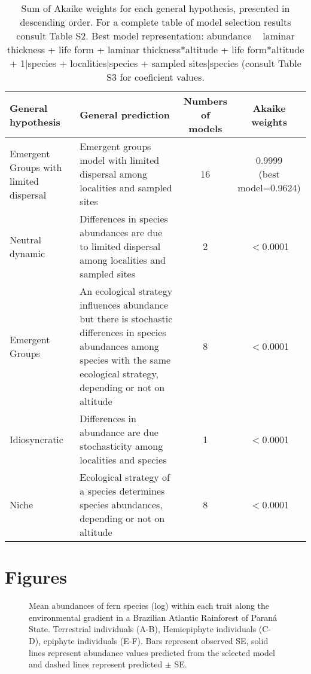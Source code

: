 \documentclass[12pt]{article}
\begin{document}
  \begin{table}[!ht]
  \caption{ Sum of Akaike weights for each general hypothesis, presented in descending order. For a complete table of model selection results consult Table S2. Best model representation: abundance ~ laminar thickness + life form + laminar thickness*altitude + life form*altitude + 1|species + localities|species + sampled sites|species (consult Table S3 for coeficient values.}\label{pesos}
  \begin{tabular}{p{4cm}p{6cm}cc}
   
\hline \bf General hypothesis	& \bf General prediction & \makecell{\bf Numbers \\ \bf of models} & \bf \makecell{Akaike \\ weights}	\\ \hline
Emergent Groups with limited dispersal & Emergent groups model with limited dispersal among localities and sampled sites  & 16 &  \makecell{0.9999 \\ (best model=0.9624)}\\  

Neutral dynamic	&	Differences in species abundances are due to limited dispersal 
among localities and sampled sites &	2 & {$<$}0.0001		\\ 

Emergent Groups	&	An ecological strategy influences abundance but there is 
stochastic differences in species abundances among species with the same 
ecological strategy, depending or not on altitude	& 8 &  {$<$}0.0001	\\ 

Idiosyncratic	&	Differences in abundance are due stochasticity among localities and 
species	 & 1	& {$<$}0.0001	\\ 

Niche	&	Ecological strategy of a species determines species abundances, depending or not on altitude	
& 8	& {$<$}0.0001		\\ \hline

\end{tabular}
\end{table}


\clearpage

\section*{Figures}

\begin{figure}[!h]
\caption{Mean abundances of fern species (log) within each trait
    along the environmental gradient in a Brazilian Atlantic Rainforest of Paran\'a State. 
    Terrestrial individuals (A-B), Hemiepiphyte individuals
  (C-D), epiphyte individuals (E-F). Bars represent observed SE, solid lines represent abundance
  values predicted from the selected model and dashed lines represent predicted {$\pm$} SE.}\label{grad}
\end{figure}
\end{document}
